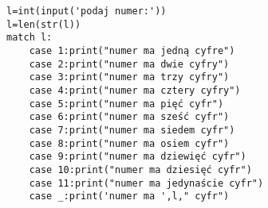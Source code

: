 \begin{verbatim}
l=int(input('podaj numer:'))
l=len(str(l))
match l:
    case 1:print("numer ma jedną cyfre")
    case 2:print("numer ma dwie cyfry")
    case 3:print("numer ma trzy cyfry")
    case 4:print("numer ma cztery cyfry")
    case 5:print("numer ma pięć cyfr")
    case 6:print("numer ma sześć cyfr")
    case 7:print("numer ma siedem cyfr")
    case 8:print("numer ma osiem cyfr")
    case 9:print("numer ma dziewięć cyfr")
    case 10:print("numer ma dziesięć cyfr")
    case 11:print("numer ma jedynaście cyfr")
    case _:print('numer ma ',l," cyfr")
\end{verbatim}